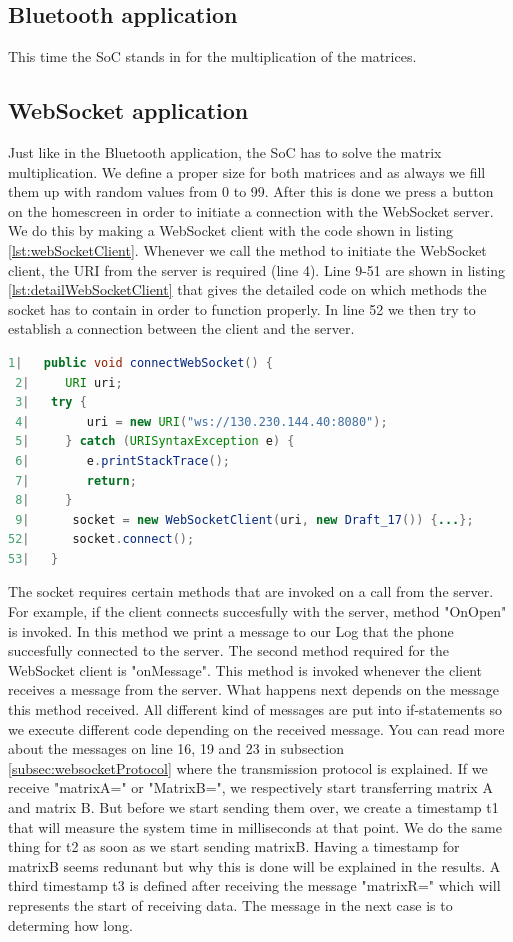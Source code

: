\documentclass[a4paper, 11pt]{report}
\begin{document}
	\subsection{Bluetooth application}
This time the SoC stands in for the multiplication of the matrices. 

	\subsection{WebSocket application}
Just like in the Bluetooth application, the SoC has to solve the matrix multiplication. We define a proper size for both matrices and as always we fill them up with random values from 0 to 99. After this is done we press a button on the homescreen in order to initiate a connection with the WebSocket server. We do this by making a WebSocket client with the code shown in listing \ref{lst:webSocketClient}. Whenever we call the method to initiate the WebSocket client, the URI from the server is required (line 4).  Line 9-51 are shown in listing \ref{lst:detailWebSocketClient} that gives the detailed code on which methods the socket has to contain in order to function properly. In line 52 we then try to establish a connection between the client and the server.

\begin{lstlisting}[caption={Making a WebSocket client},captionpos=b, label={lst:webSocketClient}, language=java, float=h]
 1|   public void connectWebSocket() {
 2|     URI uri;
 3|   try {
 4|        uri = new URI("ws://130.230.144.40:8080");
 5|     } catch (URISyntaxException e) {
 6|        e.printStackTrace();
 7|        return;
 8|     }
 9|      socket = new WebSocketClient(uri, new Draft_17()) {...};
52|      socket.connect();
53|   }
\end{lstlisting}

The socket requires certain methods that are invoked on a call from the server. For example, if the client connects succesfully with the server, method "OnOpen" is invoked. In this method we print a message to our Log that the phone succesfully connected to the server. The second method required for the WebSocket client is "onMessage". This method is invoked whenever the client receives a message from the server. What happens next depends on the message this method received. All different kind of messages are put into if-statements so we execute different code depending on the received message. You can read more about the messages on line 16, 19 and 23 in subsection \ref{subsec:websocketProtocol} where the transmission protocol is explained. If we receive "matrixA=" or "MatrixB=", we respectively start transferring matrix A and matrix B. But before we start sending them over, we create a timestamp t1 that will measure the system time in milliseconds at that point. We do the same thing for t2 as soon as we start sending matrixB. Having a timestamp for matrixB seems redunant but why this is done will be explained in the results. A third timestamp t3 is defined after receiving the message "matrixR=" which will represents the start of receiving data. The message in the next case is to determing how long.
\end{document}
